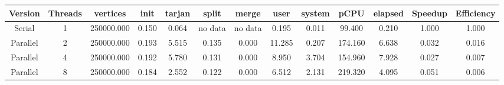 \begin{tabular}{|c|c|c|c|c|c|c|c|c|c|c|c|c|}
\toprule
 Version &  Threads &   vertices &  init &  tarjan &   split &   merge &   user &  system &    pCPU &  elapsed &  Speedup &  Efficiency \\
\midrule
  Serial &        1 & 250000.000 & 0.150 &   0.064 & no data & no data &  0.195 &   0.011 &  99.400 &    0.210 &    1.000 &       1.000 \\
Parallel &        2 & 250000.000 & 0.193 &   5.515 &   0.135 &   0.000 & 11.285 &   0.207 & 174.160 &    6.638 &    0.032 &       0.016 \\
Parallel &        4 & 250000.000 & 0.192 &   5.780 &   0.131 &   0.000 &  8.950 &   3.704 & 154.960 &    7.928 &    0.027 &       0.007 \\
Parallel &        8 & 250000.000 & 0.184 &   2.552 &   0.122 &   0.000 &  6.512 &   2.131 & 219.320 &    4.095 &    0.051 &       0.006 \\
\bottomrule
\end{tabular}
